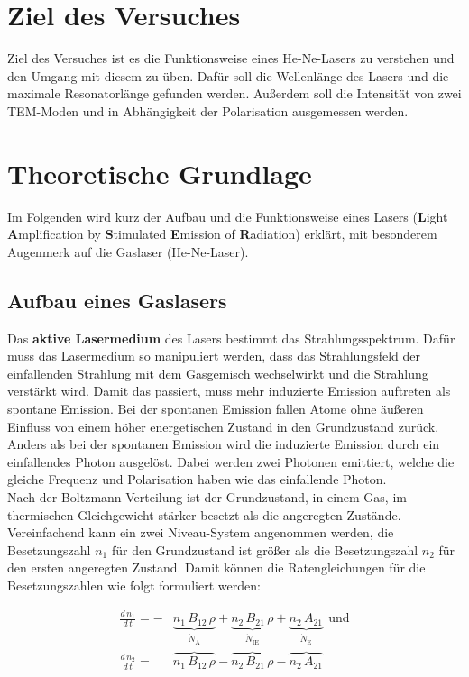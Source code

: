 \section{Ziel des Versuches}
Ziel des Versuches ist es die Funktionsweise eines He-Ne-Lasers zu verstehen und den Umgang mit diesem zu üben. Dafür soll die Wellenlänge des Lasers und die maximale Resonatorlänge gefunden werden. Außerdem soll die Intensität von zwei TEM-Moden und in Abhängigkeit der Polarisation ausgemessen werden.


\section{Theoretische Grundlage}
Im Folgenden wird kurz der Aufbau und die Funktionsweise eines Lasers (\textbf{L}ight \textbf{A}mplification by \textbf{S}timulated \textbf{E}mission of \textbf{R}adiation) erklärt, mit besonderem Augenmerk auf die Gaslaser (He-Ne-Laser).
\subsection{Aufbau eines Gaslasers}
Das \textbf{aktive Lasermedium} des Lasers bestimmt das Strahlungsspektrum. Dafür muss das Lasermedium so manipuliert werden, dass das Strahlungsfeld der einfallenden Strahlung mit dem Gasgemisch wechselwirkt und die Strahlung verstärkt wird. Damit das passiert, muss mehr induzierte Emission auftreten als spontane Emission. Bei der spontanen Emission fallen Atome ohne äußeren Einfluss von einem höher energetischen Zustand in den Grundzustand zurück. Anders als bei der spontanen Emission wird die induzierte Emission durch ein einfallendes Photon ausgelöst. Dabei werden zwei Photonen emittiert, welche die gleiche Frequenz und Polarisation haben wie das einfallende Photon. \\
Nach der Boltzmann-Verteilung ist der Grundzustand, in einem Gas, im thermischen Gleichgewicht stärker besetzt als die angeregten Zustände. Vereinfachend kann ein zwei Niveau-System angenommen werden, die Besetzungszahl $n_1$ für den Grundzustand ist größer als die Besetzungszahl $n_2$ für den ersten angeregten Zustand. Damit können die Ratengleichungen für die Besetzungszahlen wie folgt formuliert werden:

\begin{align}
	\frac{d\,n_1}{d\,t} = - &\underbrace{n_1\,B_{12}\,\rho}_{\dot{N}_\text{A}} + \underbrace{n_2\,B_{21}\,\rho}_{\dot{N}_\text{IE}} + \underbrace{n_2\,A_{21}}_{\dot{N}_\text{E}}\ \ \text{und}\\
	\frac{d\,n_2}{d\,t} = \ \ \ &\overbrace{n_1\,B_{12}\,\rho}_{} - \overbrace{n_2\,B_{21}\,\rho}_{} - \overbrace{n_2\,A_{21}}_{}
\end{align}

